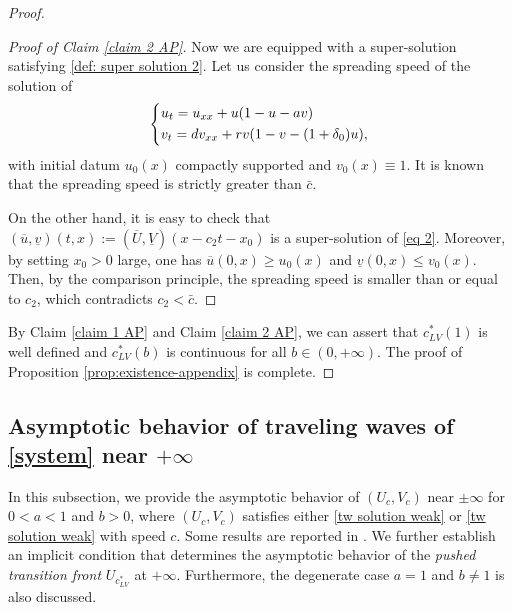 \documentclass[11pt,a4paper]{article}
\numberwithin{equation}{section}
\numberwithin{figure}{section}
\newcommand{\blue}[1]{{\color{blue}#1}}
\begin{document}
\begin{proof}
\begin{proof}[Proof of Claim \ref{claim 2 AP}]
Now we are equipped with a super-solution satisfying \eqref{def: super solution 2}. Let us consider the spreading speed of the solution of 
\begin{equation}\label{eq 2}
    \left\{\begin{aligned}\relax
    & u_t=u_{xx}+u(1-u-av) \\ 
        & v_t=dv_{xx}+rv(1-v-(1+\delta_0)u), 
    \end{aligned}\right.
\end{equation}
with initial datum $u_0(x)$ compactly supported and $v_0(x)\equiv 1$.  It is known that the spreading speed is strictly greater than $\bar c$. 

On the other hand, it is easy to check that $(\overline u, \underline v)(t,x):=(\overline U,\underline V)(x-c_2t-x_0)$ is a super-solution of \eqref{eq 2}. Moreover, by setting $x_0>0$ large, one has $\overline u(0,x)\ge u_0(x)$ and $\underline v(0,x)\le v_0(x)$. Then, by the comparison principle, the spreading speed is smaller than or equal to $c_2$, which contradicts $c_2<\bar c$. 
\end{proof}
By Claim \ref{claim 1 AP} and Claim \ref{claim 2 AP}, we can assert that $c^*_{LV}(1)$ is well defined and $c^*_{LV}(b)$ is continuous for all $b\in(0,+\infty)$. The proof of Proposition \ref{prop:existence-appendix} is complete.
\end{proof}



\subsection{Asymptotic behavior of traveling waves of \eqref{system} near $+\infty$}\label{subsec:Asymp behavior}

\noindent

In this subsection, we provide the asymptotic behavior of $(U_c,V_c)$ near $\pm\infty$
for $0<a<1$ and $b>0$, where $(U_c,V_c)$ satisfies either \eqref{tw solution weak} or \eqref{tw solution weak} with speed $c$.
Some results are reported in \cite{MoritaTachibana2009}.
We further establish an implicit condition that determines the asymptotic behavior of the {\em pushed transition front} $U_{c_{LV}^*}$ at $+\infty$. Furthermore, the degenerate case $a=1$ and $b\neq 1$ is also discussed.
\end{document}
